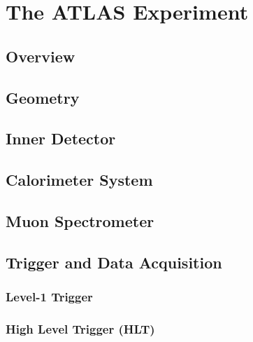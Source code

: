 \chapter{The ATLAS Experiment}\label{chapter:ATLAS}

\section{Overview}

\section{Geometry}

\section{Inner Detector}

\section{Calorimeter System}

\section{Muon Spectrometer}

\section{Trigger and Data Acquisition}

\subsection{Level-1 Trigger}

\subsection{High Level Trigger (HLT)}
